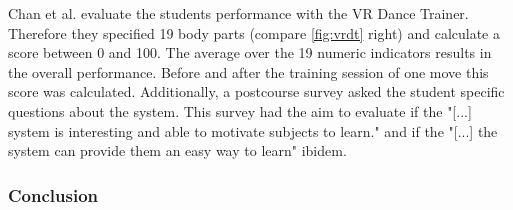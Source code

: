 Chan et al. evaluate the students performance with the VR Dance Trainer. Therefore they specified 19 body parts (compare \ref{fig:vrdt} right) and calculate a score between 0 and 100. The average over the 19 numeric indicators results in the overall performance. Before and after the training session of one move this score was calculated. Additionally, a postcourse survey asked the student specific questions about the system. This survey had the aim to evaluate if the "[...] system is interesting and able to motivate subjects to learn." \cite{Chan2011} and if the "[...] the system can provide them an easy way to learn" ibidem.

\subsubsection{Conclusion}

